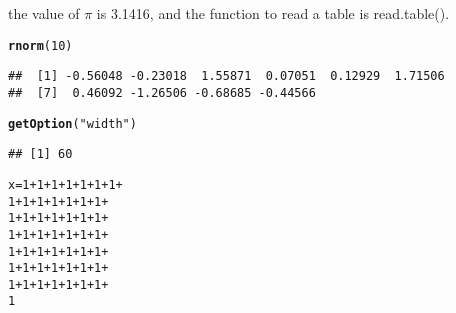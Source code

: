 \documentclass{article}\usepackage[]{graphicx}\usepackage[]{color}
\makeatletter
\newcommand{\hlnum}[1]{\textcolor[rgb]{0.686,0.059,0.569}{#1}}%
\newcommand{\hlstr}[1]{\textcolor[rgb]{0.192,0.494,0.8}{#1}}%
\newcommand{\hlopt}[1]{\textcolor[rgb]{0,0,0}{#1}}%
\newcommand{\hlstd}[1]{\textcolor[rgb]{0.345,0.345,0.345}{#1}}%
\newcommand{\hlkwb}[1]{\textcolor[rgb]{0.69,0.353,0.396}{#1}}%
\newcommand{\hlkwd}[1]{\textcolor[rgb]{0.737,0.353,0.396}{\textbf{#1}}}%
\newenvironment{kframe}{%
 \def\at@end@of@kframe{}%
 \ifinner\ifhmode%
  \def\at@end@of@kframe{\end{minipage}}%
  \begin{minipage}{\columnwidth}%
 \fi\fi%
 \def\FrameCommand##1{\hskip\@totalleftmargin \hskip-\fboxsep
 \colorbox{shadecolor}{##1}\hskip-\fboxsep
     \hskip-\linewidth \hskip-\@totalleftmargin \hskip\columnwidth}%
 \MakeFramed {\advance\hsize-\width
   \@totalleftmargin\z@ \linewidth\hsize
   \@setminipage}}%
 {\par\unskip\endMakeFramed%
 \at@end@of@kframe}
\newenvironment{knitrout}{}{} %
\makeatother
\begin{document}
the value of $\pi$ is 3.1416, and the function to read a table is read.table().

\begin{knitrout}
\color{fgcolor}\begin{kframe}
\begin{alltt}
\hlkwd{rnorm}\hlstd{(}\hlnum{10}\hlstd{)}
\end{alltt}
\begin{verbatim}
##  [1] -0.56048 -0.23018  1.55871  0.07051  0.12929  1.71506
##  [7]  0.46092 -1.26506 -0.68685 -0.44566
\end{verbatim}
\end{kframe}
\end{knitrout}

\begin{knitrout}
\color{fgcolor}\begin{kframe}
\begin{alltt}
\hlkwd{getOption}\hlstd{(}\hlstr{"width"}\hlstd{)}
\end{alltt}
\begin{verbatim}
## [1] 60
\end{verbatim}
\begin{alltt}
\hlstd{x} \hlkwb{=} \hlnum{1} \hlopt{+} \hlnum{1} \hlopt{+} \hlnum{1} \hlopt{+} \hlnum{1} \hlopt{+} \hlnum{1} \hlopt{+} \hlnum{1} \hlopt{+} \hlnum{1} \hlopt{+}
    \hlnum{1} \hlopt{+} \hlnum{1} \hlopt{+} \hlnum{1} \hlopt{+} \hlnum{1} \hlopt{+} \hlnum{1} \hlopt{+} \hlnum{1} \hlopt{+} \hlnum{1} \hlopt{+}
    \hlnum{1} \hlopt{+} \hlnum{1} \hlopt{+} \hlnum{1} \hlopt{+} \hlnum{1} \hlopt{+} \hlnum{1} \hlopt{+} \hlnum{1} \hlopt{+} \hlnum{1} \hlopt{+}
    \hlnum{1} \hlopt{+} \hlnum{1} \hlopt{+} \hlnum{1} \hlopt{+} \hlnum{1} \hlopt{+} \hlnum{1} \hlopt{+} \hlnum{1} \hlopt{+} \hlnum{1} \hlopt{+}
    \hlnum{1} \hlopt{+} \hlnum{1} \hlopt{+} \hlnum{1} \hlopt{+} \hlnum{1} \hlopt{+} \hlnum{1} \hlopt{+} \hlnum{1} \hlopt{+} \hlnum{1} \hlopt{+}
    \hlnum{1} \hlopt{+} \hlnum{1} \hlopt{+} \hlnum{1} \hlopt{+} \hlnum{1} \hlopt{+} \hlnum{1} \hlopt{+} \hlnum{1} \hlopt{+} \hlnum{1} \hlopt{+}
    \hlnum{1} \hlopt{+} \hlnum{1} \hlopt{+} \hlnum{1} \hlopt{+} \hlnum{1} \hlopt{+} \hlnum{1} \hlopt{+} \hlnum{1} \hlopt{+} \hlnum{1} \hlopt{+}
    \hlnum{1}
\end{alltt}
\end{kframe}
\end{knitrout}
\end{document}
